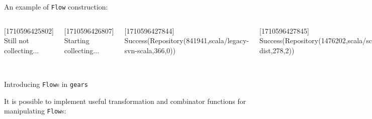 \documentclass[aspectratio=1610,xcolor=dvipsnames,handout]{beamer}
\begin{document}
%
\begin{frame}
  An example of \texttt{Flow} construction: 
  
\end{frame}
%
\begin{frame}
  \begin{columns}
      

      

      \footnotesize
      [1710596425802] Still not collecting...

      [1710596426807] Starting collecting...

      [1710596427844] Success(Repository(841941,scala/legacy-svn-scala,366,0))

      [1710596427845] Success(Repository(1476202,scala/scala-dist,278,2))

      ...

      [1710596428750] Done!

      \vspace*{0.4cm}

      [1710596865118] Still not collecting...

      [1710596866120] Starting collecting...

      [1710596866383] Failure(java.lang.Exception:\{"message":"Not Found",...\})

      [1710596866383] Done!

      \vspace*{1.2cm}
  \end{columns}
\end{frame}
%
\begin{frame}{Introducing \texttt{Flow}s in \texttt{gears}}
  
\end{frame}
%
\begin{frame}
  
\end{frame}
%
\begin{frame}
  It is possible to implement useful transformation and combinator functions for manipulating \texttt{Flow}s:
  
\end{frame}
%
\end{document}
